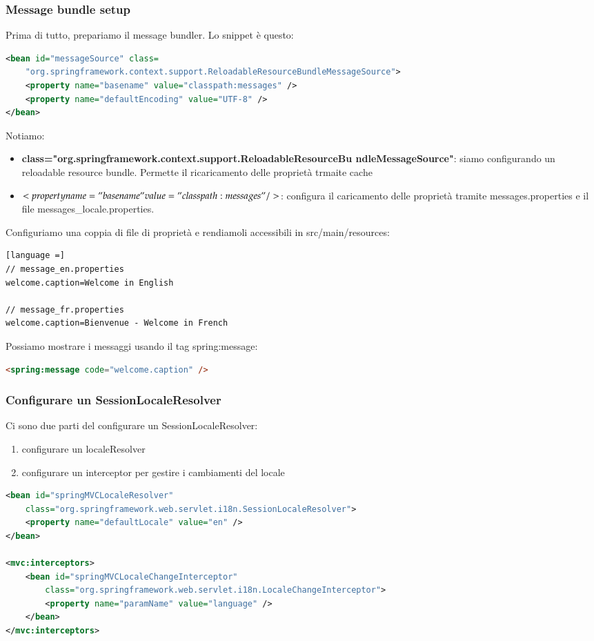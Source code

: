 \documentclass[11pt,a4paper]{book}
\begin{document}
\subsubsection{Message bundle setup}
Prima di tutto, prepariamo il message bundler. Lo snippet è questo:
\begin{lstlisting}[language = XML]
<bean id="messageSource" class=
	"org.springframework.context.support.ReloadableResourceBundleMessageSource">
	<property name="basename" value="classpath:messages" />
	<property name="defaultEncoding" value="UTF-8" />
</bean>
\end{lstlisting}
Notiamo:
\begin{itemize}
	\item \textbf{class="org.springframework.context.support.ReloadableResourceBu
ndleMessageSource"}: siamo configurando un reloadable resource bundle. Permette il ricaricamento delle proprietà trmaite cache
	\item \textbf{$<property name="basename" value="classpath:messages" />$}: configura il caricamento delle proprietà tramite messages.properties e il file messages\_{locale}.properties.
\end{itemize}
Configuriamo una coppia di file di proprietà e rendiamoli accessibili in src/main/resources:
\begin{lstlisting}[language =]
// message_en.properties
welcome.caption=Welcome in English

// message_fr.properties
welcome.caption=Bienvenue - Welcome in French
\end{lstlisting}
Possiamo mostrare i messaggi usando il tag spring:message:
\begin{lstlisting}[language = HTML]
<spring:message code="welcome.caption" />
\end{lstlisting}

\subsubsection{Configurare un SessionLocaleResolver}
Ci sono due parti del configurare un SessionLocaleResolver:
\begin{enumerate}
	\item configurare un localeResolver
	\item configurare un interceptor per gestire i cambiamenti del locale
\end{enumerate}

\begin{lstlisting}[language = XML]
<bean id="springMVCLocaleResolver"
	class="org.springframework.web.servlet.i18n.SessionLocaleResolver">
	<property name="defaultLocale" value="en" />
</bean>

<mvc:interceptors>
	<bean id="springMVCLocaleChangeInterceptor"
		class="org.springframework.web.servlet.i18n.LocaleChangeInterceptor">
		<property name="paramName" value="language" />
	</bean>
</mvc:interceptors>
\end{lstlisting}
\end{document}

